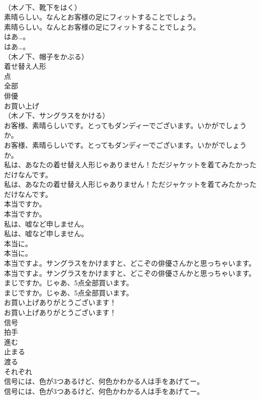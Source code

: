 \documentclass[8pt]{extreport}
\begin{document}
\begin{CJK}{UTF8}{min}
\\	（木ノ下、靴下をはく）	
\\	素晴らしい。なんとお客様の足にフィットすることでしょう。	
\\	素晴らしい。なんとお客様の足にフィットすることでしょう。 
\\	はあ…。	
\\	はあ…。 
\\	（木ノ下、帽子をかぶる）	
\\	着せ替え人形
\\	点
\\	全部
\\	俳優
\\	お買い上げ
\\	（木ノ下、サングラスをかける）	
\\	お客様、素晴らしいです。とってもダンディーでございます。いかがでしょうか。	
\\	お客様、素晴らしいです。とってもダンディーでございます。いかがでしょうか。 
\\	私は、あなたの着せ替え人形じゃありません！ただジャケットを着てみたかっただけなんです。	
\\	私は、あなたの着せ替え人形じゃありません！ただジャケットを着てみたかっただけなんです。 
\\	本当ですか。	
\\	本当ですか。 
\\	私は、嘘など申しません。	
\\	私は、嘘など申しません。 
\\	本当に。	
\\	本当に。 
\\	本当ですよ。サングラスをかけますと、どこぞの俳優さんかと思っちゃいます。	
\\	本当ですよ。サングラスをかけますと、どこぞの俳優さんかと思っちゃいます。 
\\	まじですか。じゃあ、5点全部買います。	
\\	まじですか。じゃあ、5点全部買います。 
\\	お買い上げありがとうございます！	
\\	お買い上げありがとうございます！ 
\\	信号
\\	拍手
\\	進む
\\	止まる
\\	渡る
\\	それぞれ
\\	信号には、色が3つあるけど、何色かわかる人は手をあげてー。	
\\	信号には、色が3つあるけど、何色かわかる人は手をあげてー。 

\end{CJK}
\end{document}
